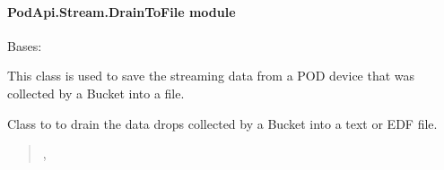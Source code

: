 \documentclass[letterpaper,10pt,english]{sphinxmanual}
\begin{document}
\paragraph{PodApi.Stream.DrainToFile module}
\label{\detokenize{PodApi.Stream:module-PodApi.Stream.DrainToFile}}\label{\detokenize{PodApi.Stream:podapi-stream-draintofile-module}}

\begin{fulllineitems}
\label{\detokenize{PodApi.Stream:PodApi.Stream.DrainToFile.DrainBucket}}
\pysigstartsignatures
{}
\pysigstopsignatures
\sphinxAtStartPar
Bases: 

\sphinxAtStartPar
This class is used to save the streaming data from a POD device that was     collected by a Bucket into a file.

\begin{fulllineitems}
\label{\detokenize{PodApi.Stream:PodApi.Stream.DrainToFile.DrainBucket.self.drainToFile}}
\pysigstartsignatures
{}
\pysigstopsignatures
\sphinxAtStartPar
Class to to drain the data drops             collected by a Bucket into a text or EDF file.
\begin{quote}\begin{description}
\sphinxAtStartPar
{\hyperref[\detokenize{PodApi.Stream.Drain:PodApi.Stream.Drain.ToText.DrainToTXT}]{}}, {\hyperref[\detokenize{PodApi.Stream.Drain:PodApi.Stream.Drain.ToEDF.DrainToEDF}]{}}


\end{description}
\end{quote}
\end{fulllineitems}
\end{fulllineitems}
\end{document}
